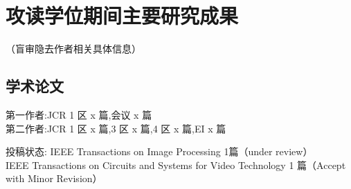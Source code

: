 \section{攻读学位期间主要研究成果} %

\ifblindreview
\noindent
（盲审隐去作者相关具体信息）
\fi
\subsection*{学术论文}

\ifblindreview

\noindent
第一作者:JCR 1 区 x 篇,会议 x 篇 \\{}
第二作者:JCR 1 区 x 篇,3 区 x 篇,4 区 x 篇,EI x 篇 

\noindent
投稿状态: 
IEEE Transactions on Image Processing 1篇（under review）\\{}
IEEE Transactions on Circuits and Systems for Video Technology 1 篇（Accept with Minor Revision）
\else

